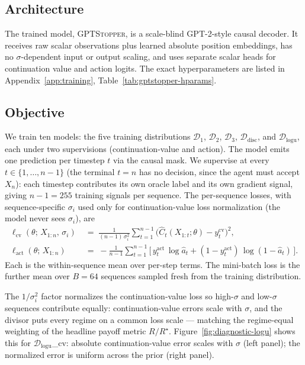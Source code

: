 \documentclass[11pt]{article}
\begin{document}
\subsection{Architecture}

The trained model, \textsc{GPTStopper}, is a scale-blind GPT-2-style causal decoder. It receives raw scalar observations plus learned absolute position embeddings, has no \(\sigma\)-dependent input or output scaling, and uses separate scalar heads for continuation value and action logits. The exact hyperparameters are listed in Appendix~\ref{app:training}, Table~\ref{tab:gptstopper-hparams}.

\subsection{Objective}
\label{sec:training-objective}

We train ten models: the five training distributions
\(\mathcal{D}_1\), \(\mathcal{D}_2\), \(\mathcal{D}_3\),
\(\mathcal{D}_{\mathrm{disc}}\), and \(\mathcal{D}_{\mathrm{logu}}\),
each under two supervisions (continuation-value and action). The model emits one prediction per timestep $t$ via the causal mask. We supervise at every $t \in \{1, \ldots, n-1\}$ (the terminal $t = n$ has no decision, since the agent must accept $X_n$): each timestep contributes its own oracle label and its own gradient signal, giving $n-1 = 255$ training signals per sequence. The per-sequence losses, with sequence-specific $\sigma_i$ used only for continuation-value loss normalization (the model never sees $\sigma_i$), are
\begin{align*}
\ell_{\mathrm{cv}}(\theta;\, X_{1:n},\, \sigma_i)
&\;=\; \frac{1}{(n-1)\,\sigma_i^{2}}\sum_{t=1}^{n-1}\!\Big(\widehat C_t(X_{1:t};\theta) - y_t^{\mathrm{cv}}\Big)^{\!2}, \\
\ell_{\mathrm{act}}(\theta;\, X_{1:n})
&\;=\; -\frac{1}{n-1}\sum_{t=1}^{n-1}\!\Big[\, y_t^{\mathrm{act}}\,\log \hat a_t + (1 - y_t^{\mathrm{act}})\,\log(1 - \hat a_t)\,\Big].
\end{align*}
Each is the within-sequence mean over per-step terms. The mini-batch loss is the further mean over $B = 64$ sequences sampled fresh from the training distribution.

The $1/\sigma_i^2$ factor normalizes the continuation-value loss so high-$\sigma$ and low-$\sigma$ sequences contribute equally: continuation-value errors scale with $\sigma$, and the divisor puts every regime on a common loss scale --- matching the regime-equal weighting of the headline payoff metric $R/R^\star$. Figure~\ref{fig:diagnostic-logu} shows this for $\mathcal{D}_{\mathrm{logu}}$\_cv: absolute continuation-value error scales with $\sigma$ (left panel); the normalized error is uniform across the prior (right panel).
\end{document}
